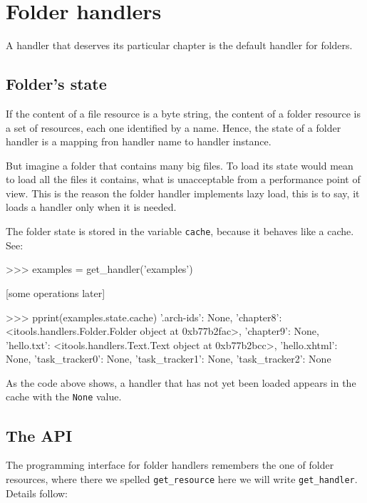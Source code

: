 \chapter{Folder handlers}

A handler that deserves its particular chapter is the default handler for
folders.


\section{Folder's state}

If the content of a file resource is a byte string, the content of a folder
resource is a set of resources, each one identified by a name. Hence, the
state of a folder handler is a mapping fron handler name to handler instance.

But imagine a folder that contains many big files. To load its state would
mean to load all the files it contains, what is unacceptable from a
performance point of view. This is the reason the folder handler implements
lazy load, this is to say, it loads a handler only when it is needed.

The folder state is stored in the variable {\tt cache}, because it behaves
like a cache. See:

\begin{code}
  >>> examples = get_handler('examples')

  [some operations later]

  >>> pprint(examples.state.cache)
  {'.arch-ids': None,
   'chapter8': <itools.handlers.Folder.Folder object at 0xb77b2fac>,
   'chapter9': None,
   'hello.txt': <itools.handlers.Text.Text object at 0xb77b2bcc>,
   'hello.xhtml': None,
   'task_tracker0': None,
   'task_tracker1': None,
   'task_tracker2': None}
\end{code}

As the code above shows, a handler that has not yet been loaded appears in
the cache with the {\tt None} value.


\section{The API}

The programming interface for folder handlers remembers the one of folder
resources, where there we spelled {\tt get\_resource} here we will write
{\tt get\_handler}. Details follow:

